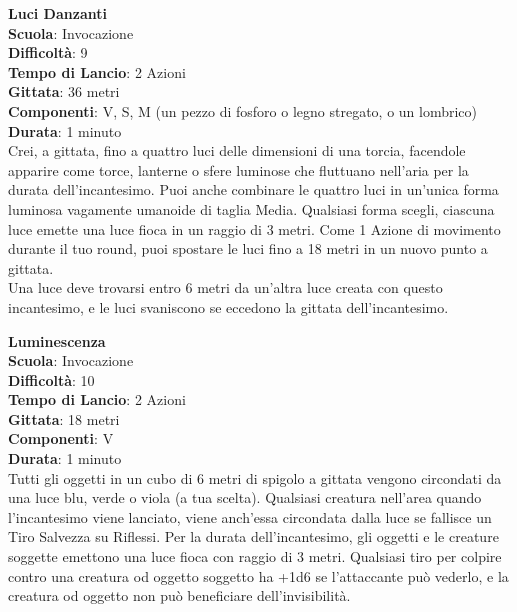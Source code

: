 \begin{multicols}{2}
\medskip\textbf{Luci Danzanti}\\
\textbf{Scuola}: Invocazione\\
\textbf{Difficoltà}: 9\\
\textbf{Tempo di Lancio}: 2 Azioni\\
\textbf{Gittata}: 36 metri\\
\textbf{Componenti}: V, S, M (un pezzo di fosforo o legno stregato, o un lombrico)\\
\textbf{Durata}: 1 minuto\\
Crei, a gittata, fino a quattro luci delle dimensioni di una torcia, facendole apparire come torce, lanterne o sfere luminose che fluttuano nell'aria per la durata dell'incantesimo. Puoi anche combinare le quattro luci in un'unica forma luminosa vagamente umanoide di taglia Media. Qualsiasi forma scegli, ciascuna luce emette una luce fioca in un raggio di 3 metri. Come 1 Azione di movimento durante il tuo round, puoi spostare le luci fino a 18 metri in un nuovo punto a gittata.\\
Una luce deve trovarsi entro 6 metri da un'altra luce creata con questo incantesimo, e le luci svaniscono se eccedono la gittata dell'incantesimo. 

\medskip\textbf{Luminescenza}\\
\textbf{Scuola}: Invocazione\\
\textbf{Difficoltà}: 10\\
\textbf{Tempo di Lancio}: 2 Azioni\\
\textbf{Gittata}: 18 metri\\
\textbf{Componenti}: V\\
\textbf{Durata}: 1 minuto \\
Tutti gli oggetti in un cubo di 6 metri di spigolo a gittata vengono circondati da una luce blu, verde o viola (a tua scelta). Qualsiasi creatura nell'area quando l'incantesimo viene lanciato, viene anch'essa circondata dalla luce se fallisce un Tiro Salvezza su Riflessi. Per la durata dell'incantesimo, gli oggetti e le creature soggette emettono una luce fioca con raggio di 3 metri. Qualsiasi tiro per colpire contro una creatura od oggetto soggetto ha +1d6 se l'attaccante può vederlo, e la creatura od oggetto non può beneficiare dell'invisibilità.


\end{multicols}
